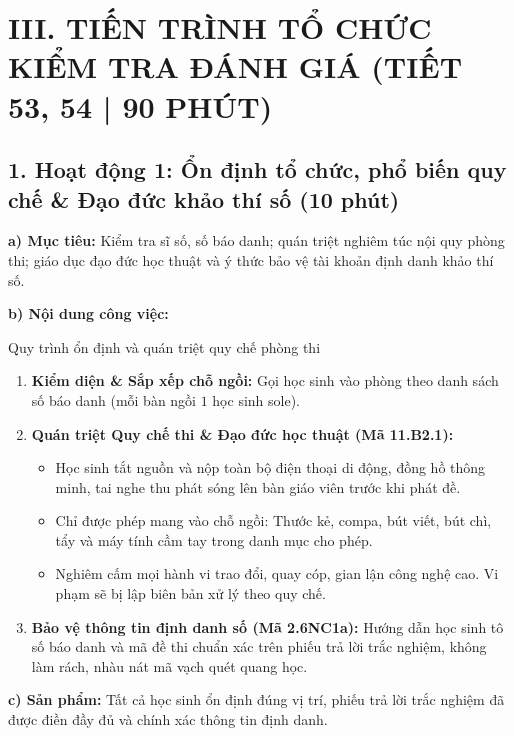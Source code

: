 \documentclass[12pt, a4paper]{article}
\begin{document}
\vspace{5pt}

\section*{III. TIẾN TRÌNH TỔ CHỨC KIỂM TRA ĐÁNH GIÁ (TIẾT 53, 54 | 90 PHÚT)}

\subsection*{1. Hoạt động 1: Ổn định tổ chức, phổ biến quy chế \& Đạo đức khảo thí số (10 phút)}

\noindent \textbf{a) Mục tiêu:}
Kiểm tra sĩ số, số báo danh; quán triệt nghiêm túc nội quy phòng thi; giáo dục đạo đức học thuật và ý thức bảo vệ tài khoản định danh khảo thí số.

\noindent \textbf{b) Nội dung công việc:}
\begin{pedabox}{Quy trình ổn định và quán triệt quy chế phòng thi}
\begin{enumerate}[leftmargin=0.6cm]
    \item \textbf{Kiểm diện \& Sắp xếp chỗ ngồi:} Gọi học sinh vào phòng theo danh sách số báo danh (mỗi bàn ngồi $1$ học sinh sole).
    \item \textbf{Quán triệt Quy chế thi \& Đạo đức học thuật (Mã 11.B2.1):}
    \begin{itemize}
        \item Học sinh tắt nguồn và nộp toàn bộ điện thoại di động, đồng hồ thông minh, tai nghe thu phát sóng lên bàn giáo viên trước khi phát đề.
        \item Chỉ được phép mang vào chỗ ngồi: Thước kẻ, compa, bút viết, bút chì, tẩy và máy tính cầm tay trong danh mục cho phép.
        \item Nghiêm cấm mọi hành vi trao đổi, quay cóp, gian lận công nghệ cao. Vi phạm sẽ bị lập biên bản xử lý theo quy chế.
    \end{itemize}
    \item \textbf{Bảo vệ thông tin định danh số (Mã 2.6NC1a):} Hướng dẫn học sinh tô số báo danh và mã đề thi chuẩn xác trên phiếu trả lời trắc nghiệm, không làm rách, nhàu nát mã vạch quét quang học.
\end{enumerate}
\end{pedabox}

\noindent \textbf{c) Sản phẩm:}
Tất cả học sinh ổn định đúng vị trí, phiếu trả lời trắc nghiệm đã được điền đầy đủ và chính xác thông tin định danh.
\end{document}

